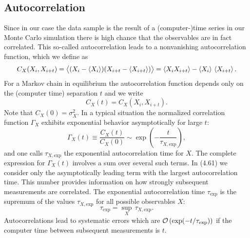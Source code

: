 \subsection{Autocorrelation}

Since in our case the data sample is the result of a (computer-)time series in
our Monte Carlo simulation there is high chance that the observables are in
fact correlated. This so-called autocorrelation leads to a nonvanishing autocorrelation function, which we define as
\begin{equation}
  C_X(X_i, X_{i+t}) = \big\langle (X_i - \left\langle X_i \right\rangle)(X_{i+t} - \left\langle X_{i+t} \right\rangle)\big\rangle
  = \left\langle X_i X_{i+t} \right\rangle - \left\langle X_i \right\rangle\,\left\langle X_{i+t} \right\rangle .
\end{equation}
For a Markov chain in equilibrium the autocorrelation function depends only
on the (computer time) separation $t$ and we write
\begin{equation}
  C_X(t) = C_X(X_i, X_{i+t}) .
\end{equation}
Note that $C_X(0) = \sigma_X^2$. In a typical situation the normalized correlation
function $\Gamma_X$ exhibits exponential behavior asymptotically for large $t$:
\begin{equation}
  \Gamma_X(t) \equiv \frac{C_X(t)}{C_X(0)} \sim \exp\!\left(-\frac{t}{\tau_{X,\mathrm{exp}}}\right),
\end{equation}
and one calls $\tau_{X,\mathrm{exp}}$ the exponential autocorrelation time for $X$. The complete expression for $\Gamma_X(t)$ involves a sum over several such terms. In (4.61)
we consider only the asymptotically leading term with the largest autocorrelation time. This number provides information on how strongly subsequent
measurements are correlated. The exponential autocorrelation time $\tau_\mathrm{exp}$ is the
supremum of the values $\tau_{X,\mathrm{exp}}$ for all possible observables $X$:
\begin{equation}
  \tau_\mathrm{exp} = \sup_{X}\,\tau_{X,\mathrm{exp}} .
\end{equation}
Autocorrelations lead to systematic errors which are $\mathcal{O}\left(\exp(-t/\tau_\mathrm{exp})\right)$ if the
computer time between subsequent measurements is $t$.

